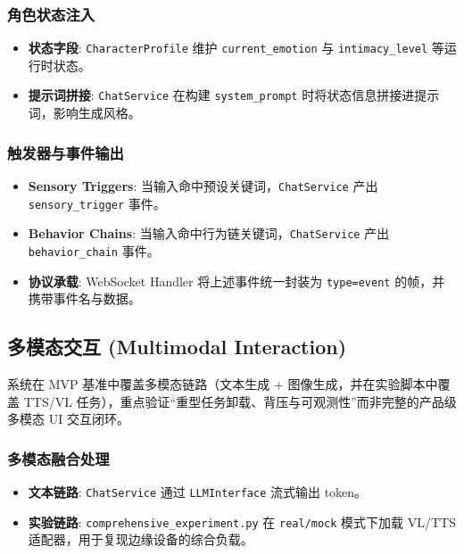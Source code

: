 \documentclass[a4paper,12pt]{article}
\begin{document}
\subsubsection{角色状态注入}
\begin{itemize}
    \item \textbf{状态字段}: \texttt{CharacterProfile} 维护 \texttt{current\_emotion} 与 \texttt{intimacy\_level} 等运行时状态。
    \item \textbf{提示词拼接}: \texttt{ChatService} 在构建 \texttt{system\_prompt} 时将状态信息拼接进提示词，影响生成风格。
\end{itemize}

\subsubsection{触发器与事件输出}
\begin{itemize}
    \item \textbf{Sensory Triggers}: 当输入命中预设关键词，\texttt{ChatService} 产出 \texttt{sensory\_trigger} 事件。
    \item \textbf{Behavior Chains}: 当输入命中行为链关键词，\texttt{ChatService} 产出 \texttt{behavior\_chain} 事件。
    \item \textbf{协议承载}: WebSocket Handler 将上述事件统一封装为 \texttt{type=event} 的帧，并携带事件名与数据。
\end{itemize}

\subsection{多模态交互 (Multimodal Interaction)}

系统在 MVP 基准中覆盖多模态链路（文本生成 + 图像生成，并在实验脚本中覆盖 TTS/VL 任务），重点验证“重型任务卸载、背压与可观测性”而非完整的产品级多模态 UI 交互闭环。

\subsubsection{多模态融合处理}
\begin{itemize}
    \item \textbf{文本链路}: \texttt{ChatService} 通过 \texttt{LLMInterface} 流式输出 token。
    \item \textbf{实验链路}: \texttt{comprehensive\_experiment.py} 在 \texttt{real/mock} 模式下加载 VL/TTS 适配器，用于复现边缘设备的综合负载。
\end{itemize}
\end{document}
